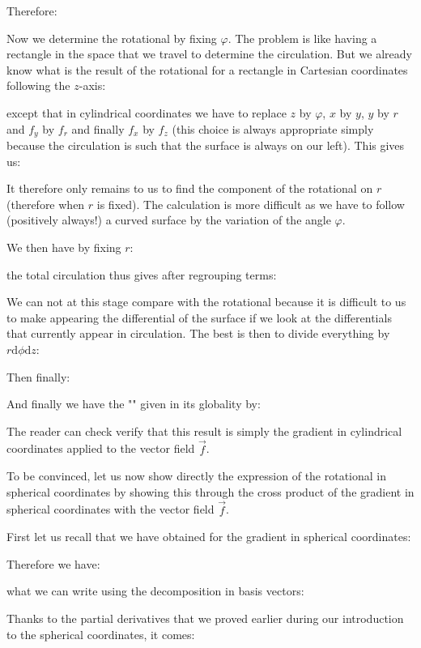 	Therefore:
	
	Now we determine the rotational by fixing $\varphi$. The problem is like having a rectangle in the space that we travel to determine the circulation. But we already know what is the result of the rotational for a rectangle in Cartesian coordinates following the $z$-axis:
	
	except that in cylindrical coordinates we have to replace $z$ by $\varphi$, $x$ by $y$, $y$ by $r$ and $f_y$ by $f_r$ and finally $f_x$ by $f_z$ (this choice is always appropriate simply because the circulation is such that the surface is always on our left). This gives us:
	
	It therefore only remains to us to find the component of the rotational on $r$ (therefore when $r$ is fixed). The calculation is more difficult as we have to follow (positively always!) a curved surface by the variation of the angle $\varphi$.
	
	We then have by fixing $r$:
	
	the total circulation thus gives after regrouping terms:
	
	We can not at this stage compare with the rotational because it is difficult to us to make appearing the differential of the surface if we look at the differentials that currently appear in circulation. The best is then to divide everything by $r\mathrm{d}\phi\mathrm{d}z$:
	
	Then finally:
	
		And finally we have the "" given in its globality by:
	
	The reader can check verify that this result is simply the gradient in cylindrical coordinates applied to the vector field $\vec{f}$.
	
	To be convinced, let us now show directly the expression of the rotational in spherical coordinates by showing this through the cross product of the gradient in spherical coordinates with the vector field $\vec{f}$.
	
	First let us recall that we have obtained for the gradient in spherical coordinates:
	
	Therefore we have:
	
	what we can write using the decomposition in basis vectors:
	
	Thanks to the partial derivatives that we proved earlier during our introduction to the spherical coordinates, it comes:
	
